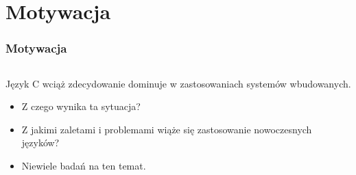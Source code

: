 \documentclass{beamer}
\let\olditem=\item
\renewcommand{\item}{\olditem \justifying}
\begin{document}
\section{Motywacja}

\begin{frame}
	\frametitle{Motywacja}

	\begin{columns}
		\begin{column}{.60\textwidth}
			\justifying
			Język C wciąż zdecydowanie dominuje w zastosowaniach
			systemów wbudowanych.

			\begin{itemize}
				\item Z czego wynika ta sytuacja?
				\item Z jakimi zaletami i problemami wiąże się zastosowanie
				      nowoczesnych języków?
				\item Niewiele badań na ten temat.
			\end{itemize}


\end{column}
\end{columns}
\end{frame}
\end{document}
